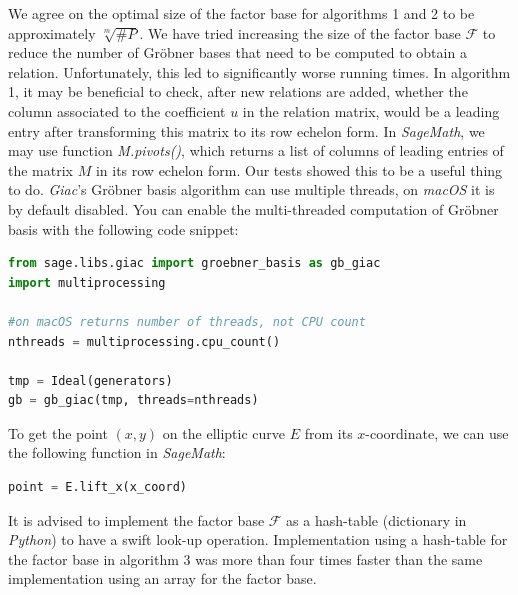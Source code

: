 \documentclass[thesis=M,english]{FITthesis}[2012/10/20]
\theoremstyle{remark}
\theoremstyle{definition}
\begin{document}
\noindent We agree on the optimal size of the factor base for algorithms 1 and 2 to be approximately $\sqrt[m]{\#P}$. We have tried increasing the size of the factor base $\mathcal{F}$ to reduce the number of Gröbner bases that need to be computed to obtain a relation. Unfortunately, this led to significantly worse running times. In algorithm 1, it may be beneficial to check, after new relations are added, whether the column associated to the coefficient $u$ in the relation matrix, would be a leading entry after transforming this matrix to its row echelon form. In \textit{SageMath}, we may use function \textit{M.pivots()}, which returns a list of columns of leading entries of the matrix $M$ in its row echelon form. Our tests showed this to be a useful thing to do. \textit{Giac}'s Gröbner basis algorithm can use multiple threads, on \textit{macOS} it is by default disabled. You can enable the multi-threaded computation of Gröbner basis with the following code snippet:
\begin{lstlisting}[language=Python]
from sage.libs.giac import groebner_basis as gb_giac
import multiprocessing

#on macOS returns number of threads, not CPU count
nthreads = multiprocessing.cpu_count() 

tmp = Ideal(generators) 
gb = gb_giac(tmp, threads=nthreads)
\end{lstlisting}
\hphantom{.}
To get the point $(x,y)$ on the elliptic curve $E$ from its $x$-coordinate, we can use the following function in \textit{SageMath}:
\begin{lstlisting}[language=Python]
point = E.lift_x(x_coord)
\end{lstlisting}
\hphantom{.}
It is advised to implement the factor base $\mathcal{F}$ as a hash-table (dictionary in \textit{Python}) to have a swift look-up operation. Implementation using a hash-table for the factor base in algorithm 3 was more than four times faster than the same implementation using an array for the factor base.
\end{document}
